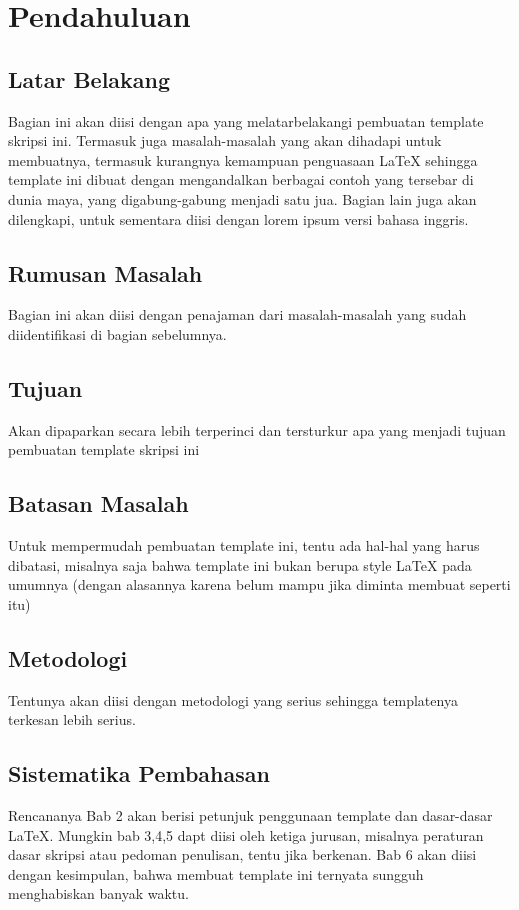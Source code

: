 \chapter{Pendahuluan}
\label{chap:intro}
   
\section{Latar Belakang}
\label{sec:label}

Bagian ini akan diisi dengan apa yang melatarbelakangi pembuatan template skripsi ini.
Termasuk juga masalah-masalah yang akan dihadapi untuk membuatnya, termasuk kurangnya kemampuan penguasaan \LaTeX{} sehingga template ini dibuat dengan mengandalkan berbagai contoh yang tersebar di dunia maya, yang digabung-gabung menjadi satu jua.
Bagian lain juga akan dilengkapi, untuk sementara diisi dengan lorem ipsum versi bahasa inggris.


\section{Rumusan Masalah}
\label{sec:rumusan}
Bagian ini akan diisi dengan penajaman dari masalah-masalah yang sudah diidentifikasi di bagian sebelumnya. 


\section{Tujuan}
\label{sec:tujuan}
Akan dipaparkan secara lebih terperinci dan tersturkur apa yang menjadi tujuan pembuatan template skripsi ini


\section{Batasan Masalah}
\label{sec:batasan}
Untuk mempermudah pembuatan template ini, tentu ada hal-hal yang harus dibatasi, misalnya saja bahwa template ini bukan berupa style \LaTeX{} pada umumnya (dengan alasannya karena belum mampu jika diminta membuat seperti itu)


\section{Metodologi}
\label{sec:metlit}
Tentunya akan diisi dengan metodologi yang serius sehingga templatenya terkesan lebih serius.


\section{Sistematika Pembahasan}
\label{sec:sispem}
Rencananya Bab 2 akan berisi petunjuk penggunaan template dan dasar-dasar \LaTeX.
Mungkin bab 3,4,5 dapt diisi oleh ketiga jurusan, misalnya peraturan dasar skripsi atau pedoman penulisan, tentu jika berkenan.
Bab 6 akan diisi dengan kesimpulan, bahwa membuat template ini ternyata sungguh menghabiskan banyak waktu.

